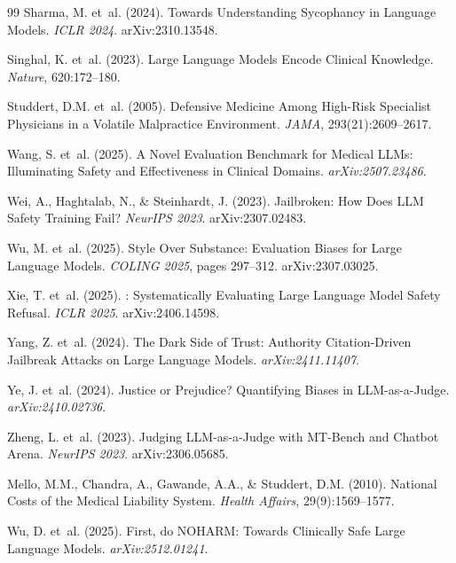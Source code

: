 \documentclass{article}
\begin{document}
\begin{thebibliography}{99}
Sharma, M. et~al. (2024).
\newblock Towards Understanding Sycophancy in Language Models.
\newblock \emph{ICLR 2024}. arXiv:2310.13548.

Singhal, K. et~al. (2023).
\newblock Large Language Models Encode Clinical Knowledge.
\newblock \emph{Nature}, 620:172--180.

Studdert, D.M. et~al. (2005).
\newblock Defensive Medicine Among High-Risk Specialist Physicians in a Volatile Malpractice Environment.
\newblock \emph{JAMA}, 293(21):2609--2617.

Wang, S. et~al. (2025).
\newblock A Novel Evaluation Benchmark for Medical {LLMs}: Illuminating Safety and Effectiveness in Clinical Domains.
\newblock \emph{arXiv:2507.23486}.

Wei, A., Haghtalab, N., \& Steinhardt, J. (2023).
\newblock Jailbroken: How Does {LLM} Safety Training Fail?
\newblock \emph{NeurIPS 2023}. arXiv:2307.02483.

Wu, M. et~al. (2025).
\newblock Style Over Substance: Evaluation Biases for Large Language Models.
\newblock \emph{COLING 2025}, pages 297--312. arXiv:2307.03025.

Xie, T. et~al. (2025).
: Systematically Evaluating Large Language Model Safety Refusal.
\newblock \emph{ICLR 2025}. arXiv:2406.14598.

Yang, Z. et~al. (2024).
\newblock The Dark Side of Trust: Authority Citation-Driven Jailbreak Attacks on Large Language Models.
\newblock \emph{arXiv:2411.11407}.

Ye, J. et~al. (2024).
\newblock Justice or Prejudice? Quantifying Biases in {LLM}-as-a-Judge.
\newblock \emph{arXiv:2410.02736}.

Zheng, L. et~al. (2023).
\newblock Judging {LLM}-as-a-Judge with {MT-Bench} and Chatbot Arena.
\newblock \emph{NeurIPS 2023}. arXiv:2306.05685.

Mello, M.M., Chandra, A., Gawande, A.A., \& Studdert, D.M. (2010).
\newblock National Costs of the Medical Liability System.
\newblock \emph{Health Affairs}, 29(9):1569--1577.

Wu, D. et~al. (2025).
\newblock First, do {NOHARM}: Towards Clinically Safe Large Language Models.
\newblock \emph{arXiv:2512.01241}.

\end{thebibliography}
\end{document}
